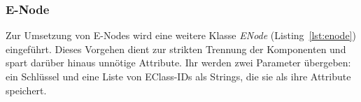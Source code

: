 




\subsubsection{E-Node}

Zur Umsetzung von E-Nodes wird eine weitere Klasse \textit{ENode} (Listing~\ref{lst:enode}) eingeführt. Dieses Vorgehen dient zur strikten Trennung der Komponenten und 
spart darüber hinaus unnötige Attribute.
Ihr werden zwei Parameter übergeben: ein Schlüssel und eine Liste von EClass-IDs als Strings, die sie als ihre Attribute speichert.

